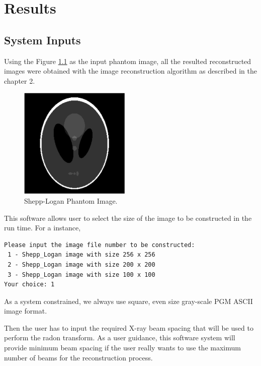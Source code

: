 
\chapter{Results} %

\label{Chapter4} %


\section{System Inputs}
Using the Figure \ref{fig:phantom} as the input phantom image, all the resulted reconstructed images were obtained with the image reconstruction algorithm as described in the chapter 2.  

\begin{figure}[H]
	\centering
		\includegraphics[width=150pt]{Figures/Sl.png}
	\caption[Input Phantom Image.]{Shepp-Logan Phantom Image.}
	\label{fig:phantom}
\end{figure}

This software allows user to select the size of the image to be constructed in the run time. For a instance, 

\begin{verbatim}
Please input the image file number to be constructed: 
 1 - Shepp_Logan image with size 256 x 256
 2 - Shepp_Logan image with size 200 x 200
 3 - Shepp_Logan image with size 100 x 100
Your choice: 1
\end{verbatim}
As a system constrained, we always use square, even size gray-scale  PGM ASCII image format. 

Then the user has to input the required X-ray beam spacing that will be used to perform the radon transform. As a user guidance, this software system will provide minimum beam spacing if the user really wants to use the maximum number of beams for the reconstruction process.


